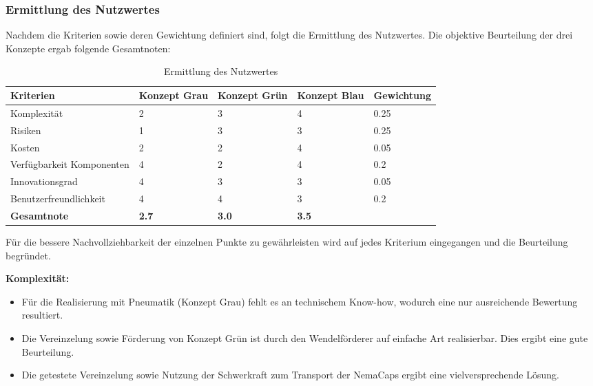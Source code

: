\subsubsection{Ermittlung des Nutzwertes}
\label{nutzwert}
Nachdem die Kriterien sowie deren Gewichtung definiert sind, folgt die Ermittlung des Nutzwertes. Die objektive Beurteilung der drei Konzepte ergab folgende Gesamtnoten:
\begin{table}[H]
\begin{tabular}{|L{4cm}|C{2.2cm}|C{2.2cm}|C{2.2cm}|C{2.3cm}|}
	\hline 
	\textbf{Kriterien} & \textbf{Konzept Grau} & \textbf{Konzept Grün} & \textbf{Konzept Blau} & \textbf{Gewichtung} \\ 
	\hline 
	Komplexität & 2 & 3 & 4 & 0.25 \\ 
	\hline 
	Risiken & 1 & 3 & 3 & 0.25 \\ 
	\hline 
	Kosten & 2 & 2 & 4 & 0.05 \\ 
	\hline 
	Verfügbarkeit Komponenten & 4 & 2 & 4 & 0.2 \\ 
	\hline 
	Innovationsgrad & 4 & 3 & 3 & 0.05 \\ 
	\hline 
	Benutzerfreundlichkeit & 4 & 4 & 3 & 0.2 \\ 
	\hline 
	\textbf{Gesamtnote} & \textbf{2.7} & \textbf{3.0} & \textbf{3.5} &  \\ 
	\hline 
\end{tabular} 
	\caption{Ermittlung des Nutzwertes}
	\label{tab:nutzwert}
\end{table}

Für die bessere Nachvollziehbarkeit der einzelnen Punkte zu gewährleisten wird auf jedes Kriterium eingegangen und die Beurteilung begründet.
\newline

\textbf{Komplexität:}
\begin{itemize}
	\item Für die Realisierung mit Pneumatik (Konzept Grau) fehlt es an technischem Know-how, wodurch eine nur ausreichende Bewertung resultiert. 
	
	\item Die Vereinzelung sowie Förderung von Konzept Grün ist durch den Wendelförderer auf einfache Art realisierbar. Dies ergibt eine gute Beurteilung.
	
	\item Die getestete Vereinzelung sowie Nutzung der Schwerkraft zum Transport der NemaCaps ergibt eine vielversprechende Lösung.
\end{itemize}

